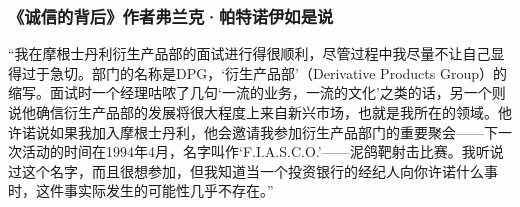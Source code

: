 \subsubsection*{《诚信的背后》作者弗兰克·帕特诺伊如是说}

“我在摩根士丹利衍生产品部的面试进行得很顺利，尽管过程中我尽量不让自己显得过于急切。部门的名称是DPG，‘衍生产品部’（Derivative Products Group）的缩写。面试时一个经理咕哝了几句‘一流的业务，一流的文化’之类的话，另一个则说他确信衍生产品部的发展将很大程度上来自新兴市场，也就是我所在的领域。他许诺说如果我加入摩根士丹利，他会邀请我参加衍生产品部门的重要聚会——下一次活动的时间在1994年4月，名字叫作‘F.I.A.S.C.O.’——泥鸽靶射击比赛。我听说过这个名字，而且很想参加，但我知道当一个投资银行的经纪人向你许诺什么事时，这件事实际发生的可能性几乎不存在。”
\par
